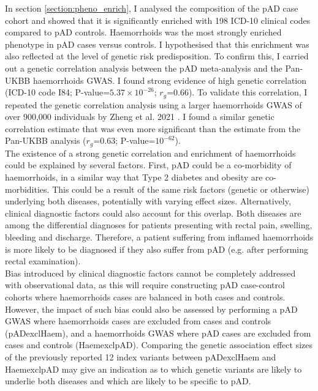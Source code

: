   In section \ref{section:pheno_enrich}, I analysed the composition of the pAD case cohort and showed that it is significantly enriched with 198 ICD-10 clinical codes compared to pAD controls. Haemorrhoids was the most strongly enriched phenotype in pAD cases versus controls. I hypothesised that this enrichment was also reflected at the level of genetic risk predisposition. To confirm this, I carried out a genetic correlation analysis between the pAD meta-analysis and the Pan-UKBB haemorrhoids GWAS. I found strong evidence of high genetic correlation (ICD-10 code I84; P-value=$5.37\times10^{-26}$; $r_{g}$=0.66). To validate this correlation, I repeated the genetic correlation analysis using a larger haemorrhoids GWAS of over 900,000 individuals by Zheng et al. 2021 \cite{Zheng2021-ss}. I found a similar genetic correlation estimate that was even more significant than the estimate from the Pan-UKBB analysis ($r_{g}$=0.63; P-value=$10^{-62}$).\\
  

  The existence of a strong genetic correlation and enrichment of haemorrhoids could be explained by several factors. First, pAD could be a co-morbidity of haemorrhoids, in a similar way that Type 2 diabetes and obesity are co-morbidities. This could be a result of the same risk factors (genetic or otherwise) underlying both diseases, potentially with varying effect sizes. Alternatively, clinical diagnostic factors could also account for this overlap. Both diseases are among the differential diagnoses for patients presenting with rectal pain, swelling, bleeding and discharge. Therefore, a patient suffering from inflamed haemorrhoids is more likely to be diagnosed if they also suffer from pAD (e.g. after performing rectal examination). \\ 

Bias introduced by clinical diagnostic factors cannot be completely addressed with observational data, as this will require constructing pAD case-control cohorts where haemorrhoids cases are  balanced in both cases and controls. However, the impact of such bias could also be assessed by performing a pAD GWAS where haemorrhoids cases are excluded from cases and controls (pADexclHaem), and a haemorrhoids GWAS where pAD cases are excluded from cases and controls (HaemexclpAD). Comparing the genetic association effect sizes of the previously reported 12 index variants between pADexclHaem and HaemexclpAD may give an indication as to which genetic variants are likely to underlie both diseases and which are likely to be specific to pAD. \\

